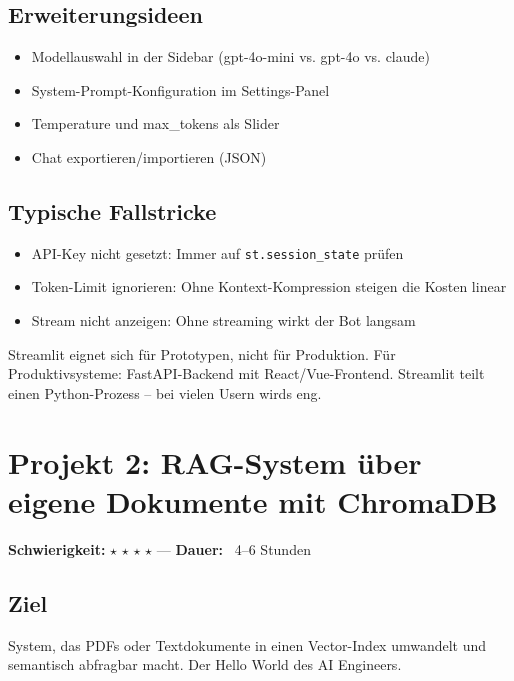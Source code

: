 \subsection*{Erweiterungsideen}
\begin{itemize}[leftmargin=*]
    \item Modellauswahl in der Sidebar (gpt-4o-mini vs. gpt-4o vs. claude)
    \item System-Prompt-Konfiguration im Settings-Panel
    \item Temperature und max\_tokens als Slider
    \item Chat exportieren/importieren (JSON)
\end{itemize}

\subsection*{Typische Fallstricke}
\begin{itemize}[leftmargin=*]
    \item API-Key nicht gesetzt: Immer auf \texttt{st.session\_state} prüfen
    \item Token-Limit ignorieren: Ohne Kontext-Kompression steigen die Kosten linear
    \item Stream nicht anzeigen: Ohne streaming wirkt der Bot langsam
\end{itemize}

\begin{praxishinweis}
Streamlit eignet sich für Prototypen, nicht für Produktion. Für Produktivsysteme: FastAPI-Backend mit React/Vue-Frontend. Streamlit teilt einen Python-Prozess -- bei vielen Usern wirds eng.
\end{praxishinweis}

\section{Projekt 2: RAG-System über eigene Dokumente mit ChromaDB}

\textbf{Schwierigkeit: }$\star$ $\star$ $\star$ $\star$ ---
\textbf{Dauer: }~4--6 Stunden

\subsection*{Ziel}
System, das PDFs oder Textdokumente in einen Vector-Index umwandelt und semantisch abfragbar macht. Der Hello World des AI Engineers.

